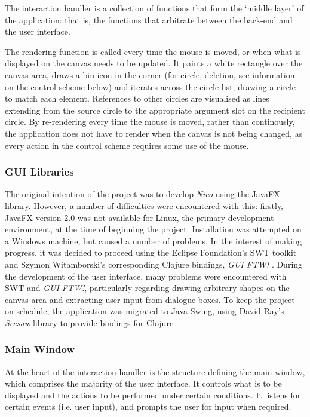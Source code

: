 \documentclass[12pt,twoside,notitlepage,xetex]{report}
\begin{document}
The interaction handler is a collection of functions that form the `middle
layer' of the application: that is, the functions that arbitrate between the
back-end and the user interface.

The rendering function is called every time the mouse is moved, or when what is displayed on the canvas needs to be updated.  It paints a white rectangle over the canvas area, draws a bin icon in the corner (for circle, deletion, see information on the control scheme below) and iterates across the circle list, drawing a circle to match each element.  References to other circles are visualised as lines extending from the source circle to the appropriate argument slot on the recipient circle.  By re-rendering every time the mouse is moved, rather than continously, the application does not have to render when the canvas is not being changed, as every action in the control scheme requires some use of the mouse.

\subsubsection{GUI Libraries}

The original intention of the project was to develop \emph{Nico} using the JavaFX library.
However, a number of difficulties were encountered with this: firstly, JavaFX
version 2.0 was not available for Linux, the primary development environment, at
the time of beginning the project.  Installation was attempted on a
Windows machine, but caused a number of problems. In the interest of making progress, it was decided to proceed
using the Eclipse Foundation's SWT toolkit and Szymon Witamborski's
corresponding Clojure bindings, \emph{GUI FTW!} \cite{GuiFtw}.  During the development of the user interface, many problems were encountered with SWT and \emph{GUI FTW!}, particularly regarding drawing
arbitrary shapes on the canvas area and extracting user input from
dialogue boxes.  To keep the project on-schedule, the application was migrated to Java Swing,
using David Ray's \emph{Seesaw} library to provide bindings for
Clojure \cite{Seesaw}.

\subsubsection{Main Window}

At the heart of the interaction handler is the structure defining the main window, which comprises the majority of the user interface.  It controls what is to be displayed and the actions to be performed under certain conditions.  It listens for certain events (i.e. user input), and prompts the user for input when required.
\end{document}
